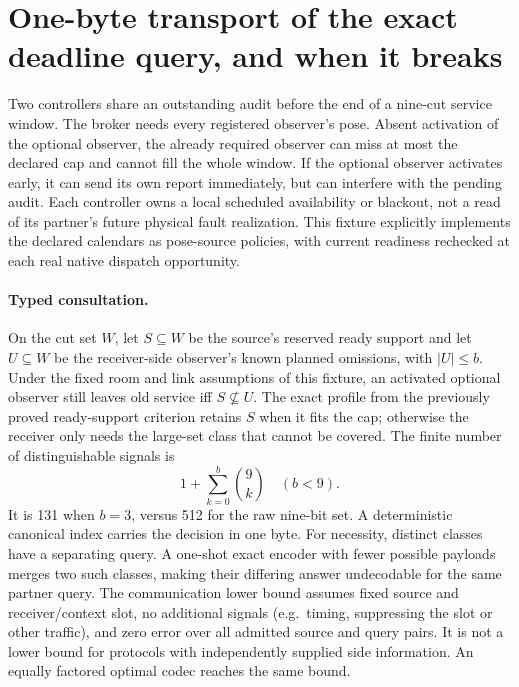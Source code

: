 \documentclass{article}
\begin{document}
\section*{One-byte transport of the exact deadline query, and when it breaks}
Two controllers share an outstanding audit before the end of a
nine-cut service window. The broker needs every registered
observer's pose. Absent activation of the optional observer, the
already required observer can miss at most the declared cap and
cannot fill the whole window. If the optional observer activates
early, it can send its own report immediately, but can interfere
with the pending audit. Each controller owns a local scheduled
availability or blackout, not a read of its partner's future
physical fault realization. This fixture explicitly implements
the declared calendars as pose-source policies, with current
readiness rechecked at each real native dispatch opportunity.

\paragraph{Typed consultation.}
On the cut set \(W\), let \(S\subseteq W\) be the source's reserved
ready support and let \(U\subseteq W\) be the receiver-side
observer's known planned omissions, with \(|U|\le b\).
Under the fixed room and link assumptions of this fixture,
an activated optional observer still leaves old service iff
\(S\not\subseteq U\). The exact profile from the previously
proved ready-support criterion retains \(S\) when it fits the cap;
otherwise the receiver only needs the large-set class that
cannot be covered. The finite number of distinguishable
signals is
\[
    1+\sum_{k=0}^{b}{9\choose k}\quad (b<9).
\]
It is 131 when \(b=3\), versus 512 for the raw nine-bit set.
A deterministic canonical index carries the decision in one
byte. For necessity, distinct classes have a separating query.
A one-shot exact encoder with fewer possible payloads merges two
such classes, making their differing answer undecodable for
the same partner query. The communication lower bound assumes
fixed source and receiver/context slot, no additional signals
(e.g.\ timing, suppressing the slot or other traffic), and zero
error over all admitted source and query pairs. It is not a
lower bound for protocols with independently supplied side
information. An equally factored optimal codec reaches the
same bound.
\end{document}
